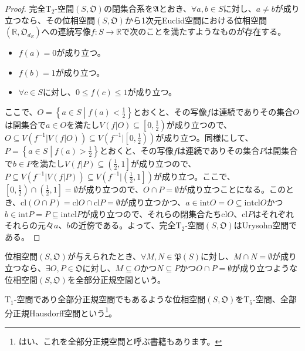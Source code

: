 \documentclass[dvipdfmx]{jsarticle}
\begin{document}
\begin{proof}
完全$\mathrm{T}_{2}$-空間$\left( S,\mathfrak{O} \right)$の閉集合系を$\mathfrak{A}$とおき、$\forall a,b \in S$に対し、$a \neq b$が成り立つなら、その位相空間$\left( S,\mathfrak{O} \right)$から1次元Euclid空間における位相空間$\left( \mathbb{R},\mathfrak{O}_{d_{E}} \right)$への連続写像$f:S \rightarrow \mathbb{R}$で次のことを満たすようなものが存在する。
\begin{itemize}
\item
  $f(a) = 0$が成り立つ。
\item
  $f(b) = 1$が成り立つ。
\item
  $\forall c \in S$に対し、$0 \leq f(c) \leq 1$が成り立つ。
\end{itemize}
ここで、$O = \left\{ a \in S \middle| f(a) < \frac{1}{2} \right\}$とおくと、その写像$f$は連続でありその集合$O$は開集合で$a \in O$を満たし$V\left( f|O \right) \subseteq \left[ 0,\frac{1}{2} \right)$が成り立つので、$O \subseteq V\left( f^{- 1}|V\left( f|O \right) \right) \subseteq V\left( f^{- 1}|\left[ 0,\frac{1}{2} \right) \right)$が成り立つ。同様にして、$P = \left\{ a \in S \middle| f(a) > \frac{1}{2} \right\}$とおくと、その写像$f$は連続でありその集合$P$は開集合で$b \in P$を満たし$V\left( f|P \right) \subseteq \left( \frac{1}{2},1 \right]$が成り立つので、$P \subseteq V\left( f^{- 1}|V\left( f|P \right) \right) \subseteq V\left( f^{- 1}|\left( \frac{1}{2},1 \right] \right)$が成り立つ。ここで、$\left[ 0,\frac{1}{2} \right) \cap \left( \frac{1}{2},1 \right] = \emptyset$が成り立つので、$O \cap P = \emptyset$が成り立つことになる。このとき、${\mathrm{cl}}(O \cap P) = {\mathrm{cl}}O \cap {\mathrm{cl}}P = \emptyset$が成り立つかつ、$a \in {\mathrm{int}}O = O \subseteq {\mathrm{int}}{{\mathrm{cl}}O}$かつ$b \in {\mathrm{int}}P = P \subseteq {\mathrm{int}}{{\mathrm{cl}}P}$が成り立つので、それらの閉集合たち${\mathrm{cl}}O$、${\mathrm{cl}}P$はそれぞれそれらの元々$a$、$b$の近傍である。よって、完全$\mathrm{T}_{2}$-空間$\left( S,\mathfrak{O} \right)$はUrysohn空間である。
\end{proof}
\begin{dfn}
位相空間$\left( S,\mathfrak{O} \right)$が与えられたとき、$\forall M,N\in \mathfrak{P}(S)$に対し、$M \cap N = \emptyset$が成り立つなら、$\exists O,P \in \mathfrak{O}$に対し、$M \subseteq O$かつ$N \subseteq P$かつ$O \cap P = \emptyset$が成り立つような位相空間$\left( S,\mathfrak{O} \right)$を全部分正規空間という。
\end{dfn}
\begin{dfn}
$\mathrm{T}_{1}$-空間であり全部分正規空間でもあるような位相空間$\left( S,\mathfrak{O} \right)$を$\mathrm{T}_{5}$-空間、全部分正規Hausdorff空間という\footnote{はい、これを全部分正規空間と呼ぶ書籍もあります。}。
\end{dfn}
\end{document}
